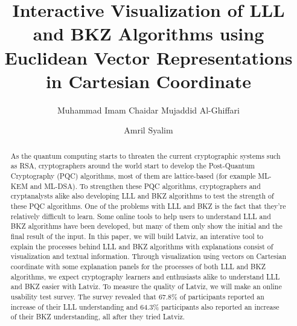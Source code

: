 \documentclass[runningheads]{llncs}
\begin{document}
%
\title{Interactive Visualization of LLL and BKZ Algorithms using Euclidean Vector Representations in Cartesian Coordinate}
%
%
\author{Muhammad Imam Chaidar Mujaddid Al-Ghiffari \and Amril Syalim}
%
%

%
\maketitle              %
%
\begin{abstract}

As the quantum computing starts to threaten the current cryptographic systems such as RSA, cryptographers around the world start to develop the Post-Quantum Cryptography (PQC) algorithms, most of them are lattice-based (for example ML-KEM and ML-DSA). To strengthen these PQC algorithms, cryptographers and cryptanalysts alike also developing LLL and BKZ algorithms to test the strength of these PQC algorithms. One of the problems with LLL and BKZ is the fact that they're relatively difficult to learn. Some online tools to help users to understand LLL and BKZ algorithms have been developed, but many of them only show the initial and the final result of the input. In this paper, we will build Latviz, an interative tool to explain the processes behind LLL and BKZ algorithms with explanations consist of visualization and textual information. Through visualization using vectors on Cartesian coordinate with some explanation panels for the processes of both LLL and BKZ algorithms, we expect cryptography learners and enthusiasts alike to understand LLL and BKZ easier with Latviz. To measure the quality of Latviz, we will make an online usability test survey. The survey revealed that 67.8\% of participants reported an increase of their LLL understanding and 64.3\% participants also reported an increase of their BKZ understanding, all after they tried Latviz.

\end{abstract}
%
%
%
\end{document}
